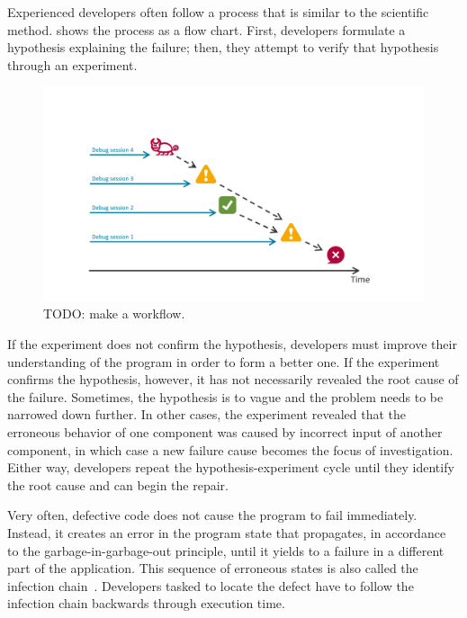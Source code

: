 Experienced developers often follow a process that is similar to the scientific method.
 shows the process as a flow chart.
First, developers formulate a hypothesis explaining the failure; then, they attempt to verify that hypothesis through an experiment. 
\begin{figure}[th]
\centering
\includegraphics[width=.9\linewidth]{img/workflow-traditional}
\caption{TODO: make a workflow.}
\label{fig:scientifiy-method}
\end{figure}
If the experiment does not confirm the hypothesis, developers must improve their understanding of the program in order to form a better one.
If the experiment confirms the hypothesis, however, it has not necessarily revealed the root cause of the failure.
Sometimes, the hypothesis is to vague and the problem needs to be narrowed down further.
In other cases, the experiment revealed that the erroneous behavior of one component was caused by incorrect input of another component, in which case a new failure cause becomes the focus of investigation.
Either way, developers repeat the hypothesis-experiment cycle until they identify the root cause and can begin the repair.

Very often, defective code does not cause the program to fail immediately.
Instead, it creates an error in the program state that propagates, in accordance to the garbage-in-garbage-out principle, until it yields to a failure in a different part of the application.
This sequence of erroneous states is also called the infection chain~\cite{zeller_09_why_programs_fail}.
Developers tasked to locate the defect have to follow the infection chain backwards through execution time.


